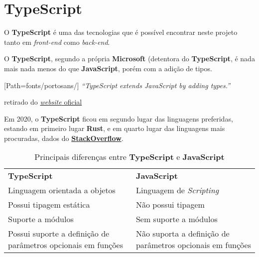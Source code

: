 \section{TypeScript}

\begin{minipage}[t]{.3\textwidth}
\end{minipage}
\begin{minipage}[t]{.7\textwidth}
	\minipagerestore

	O \textbf{TypeScript} é uma das tecnologias que é possível encontrar neste projeto tanto em \textit{front-end} como \textit{back-end}.

	O \textbf{TypeScript}, segundo a própria \textbf{Microsoft} (detentora do \textbf{TypeScript}, é nada mais nada menos do que \textbf{JavaScript}, porém com a adição de tipos.

	\begin{quotebox}
		[Path=fonts/portosans/]
		\textit{``TypeScript extends JavaScript by adding types.''}

		\tcblower

		{\scriptsize retirado do \href{https://www.typescriptlang.org}{\textit{website} oficial}}
	\end{quotebox}

\end{minipage}

Em 2020, o \textbf{TypeScript} ficou em segundo lugar das linguagens preferidas, estando em primeiro lugar \textbf{Rust}, e em quarto lugar das linguagens mais procuradas, dados do \href{https://insights.stackoverflow.com/survey/2020#technology-most-loved-dreaded-and-wanted-languages-loved}{\textbf{StackOverflow}}.

{
\renewcommand{\arraystretch}{1.25}
\begin{table}[h]
	\begin{tabularx}{\textwidth}{ |X|X| }
		\rowcolor{estg}	{\color[HTML]{FFFFFF} \textbf{TypeScript}} & {\color[HTML]{FFFFFF} \textbf{JavaScript}} \\
		Linguagem orientada a objetos & Linguagem de \textit{Scripting} \\\hline
		Possui tipagem estática & Não possui tipagem \\\hline
		Suporte a módulos & Sem suporte a módulos\\\hline
		Possui suporte a definição de parâmetros opcionais em funções & Não suporta a definição de parâmetros opcionais em funções \\\hline
	\end{tabularx}

	\caption{Principais diferenças entre \textbf{TypeScript} e \textbf{JavaScript}}
\end{table}
}


